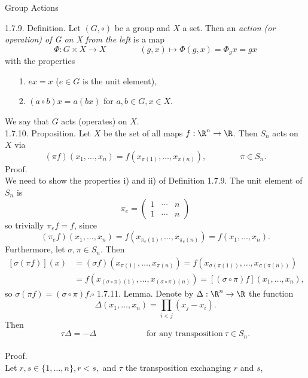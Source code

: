\documentclass[smaller,hyperref={CJKbookmarks=true}]{beamer}
\begin{document}
\begin{frame}{Group Actions}
\begin{spacing}{1.1}
\alert{1.7.9. Definition.} Let $(G,\circ)$ be a group and $X$ a set. Then an \emph{action (or operation) of G on X from the left} is a map
\[\Phi:G\times X\to X\qquad\qquad (g,x)\mapsto\Phi(g,x)=\Phi_g x=gx\]
with the properties
\begin{itemize}
  \item[1.] $ex=x$ ($e\in G$ is the unit element),
  \item[2.] $(a\circ b)x=a(bx)$ for $a,b\in G,x\in X$.
\end{itemize}
We say that $G$ acts (operates) on $X$.\\[10pt]
\alert{1.7.10. Proposition.} Let $X$ be the set of all maps $f:\R^n\to\R$. Then $S_n$ acts on $X$ via
\[(\pi f)(x_1,\ldots,x_n)=f(x_{\pi(1)},\ldots,x_{\pi(n)}),\qquad\qquad
\pi\in S_n.\]
\newpage
\alert{Proof.}\\
We need to show the properties i) and ii) of Definition 1.7.9. The unit
element of $S_n$ is
\[\pi_e=\begin{pmatrix}
          1 & \cdots & n \\
          1 & \cdots & n
        \end{pmatrix}\]
so trivially $\pi_ef=f$, since
\[(\pi_ef)(x_1,\ldots,x_n)=f(x_{\pi_e(1)},\ldots,x_{\pi_e(n)})=f(x_1,\ldots,x_n).\]
Furthermore, let $\sigma,\pi\in S_n$. Then
\begin{equation*}
  \begin{split}
     [\sigma(\pi f)](x) &=(\sigma f)(x_{\pi(1)},\ldots,x_{\pi(n)})=f(x_{\sigma(\pi(1))},\ldots,x_{\sigma(\pi(n))}) \\
       &=f(x_{(\sigma\circ\pi)(1)},\ldots,x_{(\sigma\circ\pi)(n)})=[(\sigma\circ\pi)f](x_1,\ldots,x_n),
  \end{split}
\end{equation*}
so $\sigma(\pi f)=(\sigma\circ\pi)f$.$\square$
\newpage
\alert{1.7.11. Lemma.} Denote by $\Delta:\R^n\to\R$ the function
\begin{equation}\label{1.7.15}
  \Delta(x_1,\ldots,x_n)=\prod_{i<j}(x_j-x_i).
\end{equation}
Then
\[\tau\Delta=-\Delta\qquad\qquad\qquad\text{for any transposition}~\tau\in S_n.\]
 \\[12pt]
\alert{Proof.}\\
Let $r,s\in\{1,\ldots,n\},r<s,$ and $\tau$ the transposition exchanging $r$ and $s$,
\begin{equation*}

\end{equation*}
\end{spacing}
\end{frame}
\end{document}
